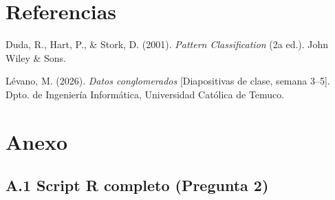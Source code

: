 \documentclass[10pt,a4paper]{article}
\begin{document}
\section{Referencias}

Duda, R., Hart, P., \& Stork, D. (2001). \textit{Pattern Classification} (2a ed.). John Wiley \& Sons.

L\'evano, M. (2026). \textit{Datos conglomerados} [Diapositivas de clase, semana 3--5]. Dpto. de Ingenier\'ia Inform\'atica, Universidad Cat\'olica de Temuco.

\newpage
\section*{Anexo}

\subsection*{A.1 Script R completo (Pregunta 2)}
\end{document}
